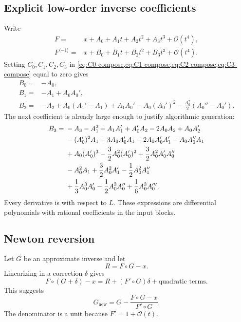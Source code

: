 \documentclass[11pt]{article}
\theoremstyle{pltheorem}
\newcommand{\bigO}{\mathcal O}
\newcommand{\rev}{\langle-1\rangle}
\newcommand{\compose}{\mathbin{\circ}}
\begin{document}
\subsection{Explicit low-order inverse coefficients}

Write
\begin{align}
 F={}&x+A_0+A_1t+A_2t^2+A_3t^3+\bigO(t^4),\label{eq:F-inverse-low}\\
 F^{\rev}={}&x+B_0+B_1t+B_2t^2+B_3t^3+\bigO(t^4).
 \label{eq:G-inverse-low}
\end{align}
Setting \(C_0,C_1,C_2,C_3\) in
\cref{eq:C0-compose,eq:C1-compose,eq:C2-compose,eq:C3-compose} equal to zero gives
\begin{align}
 B_0={}&-A_0,\label{eq:B0-inverse}\\
 B_1={}&-A_1+A_0A_0',\label{eq:B1-inverse}\\
 B_2={}&-A_2+A_0(A_1'-A_1)+A_1A_0'
 -A_0(A_0')^2
 -\frac{A_0^2}{2}(A_0''-A_0').
 \label{eq:B2-inverse}
\end{align}
The next coefficient is already large enough to justify algorithmic generation:
\begin{align}
 B_3={}&-A_3-A_1^2+A_1A_1'+A_0'A_2-2A_0A_2+A_0A_2'
 \notag\\
 &-(A_0')^2A_1+3A_0A_0'A_1-2A_0A_0'A_1'-A_0A_0''A_1
 \notag\\
 &+A_0(A_0')^3-\frac32A_0^2(A_0')^2
 +\frac32A_0^2A_0'A_0''
 \notag\\
 &-A_0^2A_1+\frac32A_0^2A_1'-\frac12A_0^2A_1''
 \notag\\
 &+\frac13A_0^3A_0'-\frac12A_0^3A_0''
 +\frac16A_0^3A_0'''.
 \label{eq:B3-inverse}
\end{align}
Every derivative is with respect to \(L\).  These expressions are differential polynomials with rational coefficients in the input blocks.

\subsection{Newton reversion}

Let \(G\) be an approximate inverse and let
\begin{equation}\label{eq:reversion-residual}
 R=F\compose G-x.
\end{equation}
Linearizing in a correction \(\delta\) gives
\[
 F\compose(G+\delta)-x
 =R+(F'\compose G)\delta+\text{quadratic terms}.
\]
This suggests
\begin{equation}\label{eq:newton-reversion}
 G_{\mathrm{new}}
 =G-\frac{F\compose G-x}{F'\compose G}.
\end{equation}
The denominator is a unit because \(F'=1+\bigO(t)\).
\end{document}
